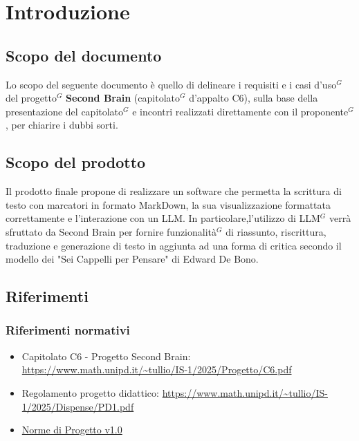 \documentclass[a4paper,10pt]{article}
\def\\{ }%
\def\\{ }%
\def\\{ }%
\begin{document}
    \newpage

    \tableofcontents

    \newpage

    \listoffigures

    \newpage

    \section{Introduzione}
    \subsection{Scopo del documento}
    Lo scopo del seguente documento è quello di delineare i requisiti e i casi d'uso$^G$ del
    progetto$^G$ \textbf{Second Brain} (capitolato$^G$ d'appalto C6), sulla base della presentazione
    del capitolato$^G$ e incontri realizzati direttamente con il proponente$^G$, per chiarire i dubbi sorti.
    \subsection{Scopo del prodotto}
    Il prodotto finale propone di realizzare un software che permetta la scrittura di testo con marcatori
    in formato MarkDown, la sua visualizzazione formattata correttamente e l'interazione con un LLM.
    In particolare,l'utilizzo di LLM$^G$ verrà sfruttato da Second Brain per fornire funzionalità$^G$
    di riassunto, riscrittura, traduzione e generazione di testo in aggiunta ad una forma di critica
    secondo il modello dei "Sei Cappelli per Pensare" di Edward De Bono.
    \subsection{Riferimenti}
    \subsubsection{Riferimenti normativi}
    \begin{itemize}
        \item Capitolato C6 - Progetto Second Brain: \\  \url{https://www.math.unipd.it/~tullio/IS-1/2025/Progetto/C6.pdf}
        \item Regolamento progetto didattico: \\ \url{https://www.math.unipd.it/~tullio/IS-1/2025/Dispense/PD1.pdf}
        \item \href{https://tool-8.github.io/Documentazione-SWE/}{Norme di Progetto v1.0}
    \end{itemize}
\end{document}
